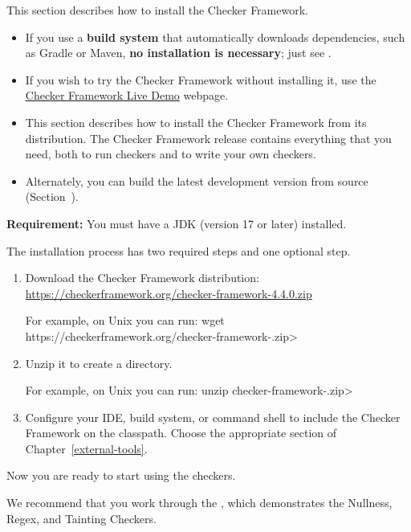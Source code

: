 
This section describes how to install the Checker Framework.
\begin{itemize}
\item
If you use a \textbf{build system} that automatically downloads dependencies,
such as Gradle or Maven, \textbf{no installation is necessary}; just see
.
\item
If you wish to try the Checker Framework without installing it, use the
\href{https://eisop.uwaterloo.ca/live/}{Checker Framework Live Demo} webpage.
\item
This section describes how to install the Checker Framework from its
distribution.  The Checker Framework release contains everything that you
need, both to run checkers and to write your own checkers.
\item
Alternately, you can build the latest development version from source
(Section~).
\end{itemize}


\textbf{Requirement:}
You must have a JDK (version 17 or later) installed.

The installation process has two required steps and one
optional step.
\begin{enumerate}
\item
  Download the Checker Framework distribution:
  \warpprintonly{\\}
  \url{https://checkerframework.org/checker-framework-4.4.0.zip}

  For example, on Unix you can run: \<wget https://checkerframework.org/checker-framework-\ReleaseVersion{}.zip>

\item
  Unzip it to create a  directory.

  For example, on Unix you can run: \<unzip checker-framework-\ReleaseVersion{}.zip>

\item
  \label{installation-configure-step}%
  Configure your IDE, build system, or command shell to include the Checker
  Framework on the classpath.  Choose the appropriate section of
  Chapter~\ref{external-tools}.


\end{enumerate}

Now you are ready to start using the checkers.

We recommend that you work through the
, which demonstrates the Nullness, Regex, and Tainting Checkers.

